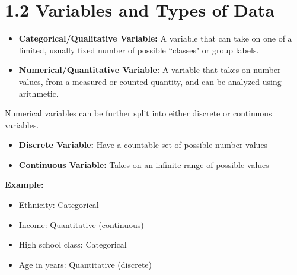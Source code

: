 \section*{1.2 Variables and Types of Data}
\begin{tcolorbox}[title=Key Terms, colback=blue!5!white, colframe=blue!75!black, breakable]
\begin{itemize}
    \item \textbf{Categorical/Qualitative Variable:} A variable that can take on one of a limited, usually fixed number of possible ``classes" or group labels.
    \item \textbf{Numerical/Quantitative Variable:} A variable that takes on number values, from a measured or counted quantity, and can be analyzed using arithmetic. 
\end{itemize}
\end{tcolorbox}
Numerical variables can be further split into either discrete or continuous variables.
\begin{tcolorbox}[title=Key Terms, colback=blue!5!white, colframe=blue!75!black, breakable]
\begin{itemize}
  \item \textbf{Discrete Variable:} Have a countable set of possible number values
  \item \textbf{Continuous Variable:} Takes on an infinite range of possible values
\end{itemize}
\end{tcolorbox}
\par\medskip
\textbf{Example:}
\begin{itemize}
  \item Ethnicity: Categorical
  \item Income: Quantitative (continuous)
  \item High school class: Categorical
  \item Age in years: Quantitative (discrete) 
\end{itemize}
\bigskip



